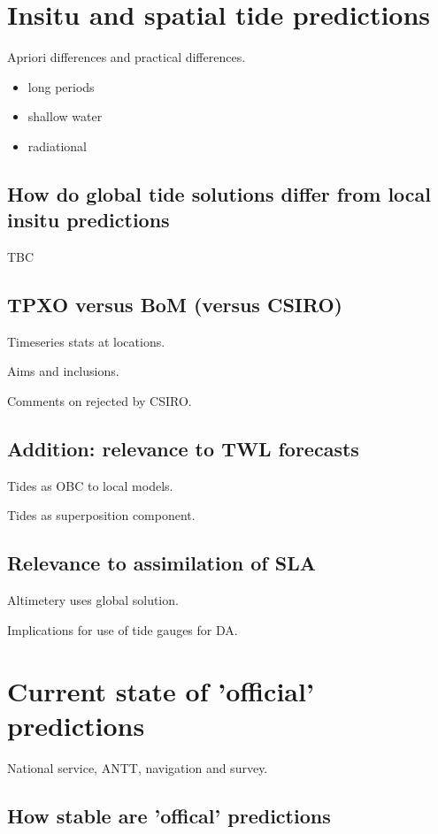 \section{Insitu and spatial tide predictions}

Apriori differences and practical differences.

\begin{itemize}
    \item long periods
    \item shallow water
    \item radiational
\end{itemize}

\subsection{How do global tide solutions differ from local insitu predictions}
TBC

\subsection{TPXO versus BoM (versus CSIRO)}
Timeseries stats at locations.

Aims and inclusions.

Comments on rejected by CSIRO.

\subsection{Addition: relevance to TWL forecasts}
Tides as OBC to local models.

Tides as superposition component.

\subsection{Relevance to assimilation of SLA}
Altimetery uses global solution.

Implications for use of tide gauges for DA.


\section{Current state of 'official' predictions}

National service, ANTT, navigation and survey.

\subsection{How stable are 'offical' predictions}

